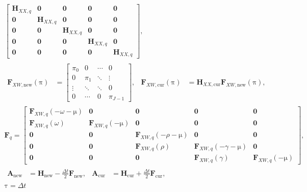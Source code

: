 \documentclass[USenglish]{article}
\renewcommand{\vec}[1]{\boldsymbol{\mathrm{#1}}}
\newcommand{\mat}[1]{\mathbf{#1}}
\begin{document}
\begin{subequations}
\begin{gather}
\begin{bmatrix}
      \mat{H}_{XX, q} & \mat{0} & \mat{0} & \mat{0} & \mat{0} \\
      \mat{0} & \mat{H}_{XX, q} & \mat{0} & \mat{0} & \mat{0} \\
      \mat{0} & \mat{0} & \mat{H}_{XX, q} & \mat{0} & \mat{0} \\
      \mat{0} & \mat{0} & \mat{0} & \mat{H}_{XX, q} & \mat{0}
      \\
      \mat{0} & \mat{0} & \mat{0} & \mat{0} & \mat{H}_{XX, q}
    \end{bmatrix},
    \\
    \begin{aligned}
      \mat{F}_{XW, \mathrm{new}}(\vec{\pi}) &=
      \begin{bmatrix}
        \pi_0 & 0 & \cdots & 0 \\
        0 & \pi_1 & \ddots & \vdots \\
        \vdots & \ddots & \ddots & 0 \\
        0 & \cdots & 0 & \pi_{J - 1}
      \end{bmatrix},
      &
      \mat{F}_{XW, \mathrm{cur}}(\vec{\pi}) &=
      \mat{H}_{XX, \mathrm{cur}} \mat{F}_{XW, \mathrm{new}}(\vec{\pi}),
    \end{aligned}
    \\
    \mat{F}_q =
    \begin{bmatrix}
      \mat{F}_{XW, q}(- \omega - \vec{\mu}) & \mat{0}
      & \mat{0} & \mat{0} & \mat{0}
      \\
      \mat{F}_{XW, q}(\omega) & \mat{F}_{XW, q}(- \vec{\mu})
      & \mat{0} & \mat{0} & \mat{0}
      \\
      \mat{0} & \mat{0}
      & \mat{F}_{XW, q}(- \rho - \vec{\mu})
      & \mat{0} & \mat{0}
      \\
      \mat{0} & \mat{0} & \mat{F}_{XW, q}(\rho)
      & \mat{F}_{XW, q}(- \gamma - \vec{\mu}) & \mat{0}
      \\
      \mat{0} & \mat{0} & \mat{0} & \mat{F}_{XW, q}(\gamma)
      & \mat{F}_{XW, q}(- \vec{\mu})
    \end{bmatrix},
    \\
    \begin{aligned}
      \mat{A}_{\mathrm{new}} &=
      \mat{H}_{\mathrm{new}} - \frac{\Delta t}{2} \mat{F}_{\mathrm{new}},
      &
      \mat{A}_{\mathrm{cur}} &=
      \mat{H}_{\mathrm{cur}} + \frac{\Delta t}{2} \mat{F}_{\mathrm{cur}},
    \end{aligned}
    \\
    \vec{\tau} =
    \Delta t

\end{gather}
\end{subequations}
\end{document}
